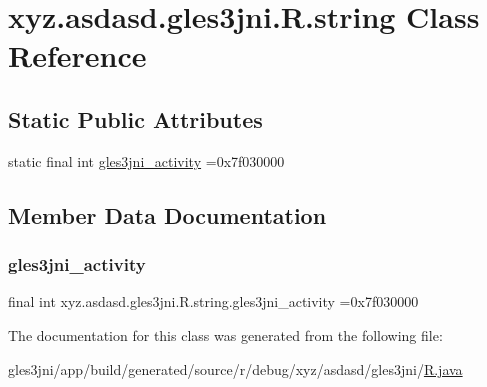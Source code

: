 \hypertarget{classxyz_1_1asdasd_1_1gles3jni_1_1_r_1_1string}{}\section{xyz.\+asdasd.\+gles3jni.\+R.\+string Class Reference}
\label{classxyz_1_1asdasd_1_1gles3jni_1_1_r_1_1string}
\subsection*{Static Public Attributes}
\begin{DoxyCompactItemize}
\item 
static final int \hyperlink{classxyz_1_1asdasd_1_1gles3jni_1_1_r_1_1string_a2fa1463a195868e3d8a4e1e442e9b405}{gles3jni\+\_\+activity} =0x7f030000
\end{DoxyCompactItemize}


\subsection{Member Data Documentation}
\mbox{\label{classxyz_1_1asdasd_1_1gles3jni_1_1_r_1_1string_a2fa1463a195868e3d8a4e1e442e9b405}} 
\subsubsection{\texorpdfstring{gles3jni\+\_\+activity}{gles3jni\_activity}}
{\footnotesize\ttfamily final int xyz.\+asdasd.\+gles3jni.\+R.\+string.\+gles3jni\+\_\+activity =0x7f030000\hspace{0.3cm}{\ttfamily [static]}}



The documentation for this class was generated from the following file\+:\begin{DoxyCompactItemize}
\item 
gles3jni/app/build/generated/source/r/debug/xyz/asdasd/gles3jni/\hyperlink{_r_8java}{R.\+java}\end{DoxyCompactItemize}
